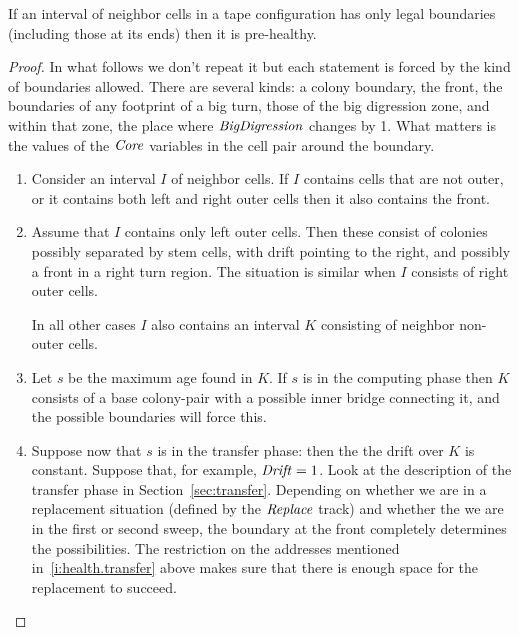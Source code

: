\documentclass[11pt]{memoir}
\theoremstyle{definition} %
\newcommand{\fld}[1]{\ensuremath{\textit{#1\/}}}
\newcommand{\BigDigression}{\fld{BigDigression}}
\newcommand{\Core}{\fld{Core}}
\newcommand{\Drift}{\fld{Drift}}
\newcommand{\Replace}{\fld{Replace}}
\begin{document}
\begin{lemma}\label{lem:boundaries-health}
  If an interval of neighbor cells in a tape configuration
  has only legal boundaries (including those at its ends) then it is pre-healthy.
\end{lemma}
\begin{proof}
  In what follows we don't repeat it but each statement is forced by the kind of boundaries
  allowed.
  There are several kinds: a colony boundary, the front, the boundaries of any footprint of a big turn,
  those of the big digression zone,
  and within that zone, the place where \( \BigDigression \) changes by 1.
  What matters is the values of the \( \Core \) variables in the cell pair around the boundary.

  \begin{enumerate}
\item Consider an interval \( I \) of neighbor cells.
  If  \( I \) contains cells that are not outer, or it contains both left and right outer cells
  then it also contains the front.

\item Assume that \( I \) contains only left outer cells.
  Then these consist of colonies possibly separated by stem cells, with drift pointing to the right,
  and possibly a front in a right turn region.
 The situation is similar when \( I \) consists of right outer cells.

In all other cases \( I \)
also contains an interval \( K \) consisting of neighbor non-outer cells.
  
\item Let \( s \) be the maximum age found in \( K \).
  If \( s \) is in the computing phase then \( K \) consists
  of a base colony-pair with a possible inner bridge connecting it, and the
  possible boundaries will force this.

\item Suppose now that \( s \) is in the transfer phase: then the 
  the drift over \( K \) is constant.
  Suppose that, for example, \( \Drift=1 \).
  Look at the description of the transfer phase in Section~\ref{sec:transfer}.
  Depending on whether we are in a replacement situation (defined by the \( \Replace \) track)
  and whether the we are in the first or second sweep, the boundary at the front completely
  determines the possibilities.
  The restriction on the addresses mentioned in~\eqref{i:health.transfer}
  above makes sure that there is enough space for the replacement to succeed.
  \end{enumerate}
\end{proof}
\end{document}
